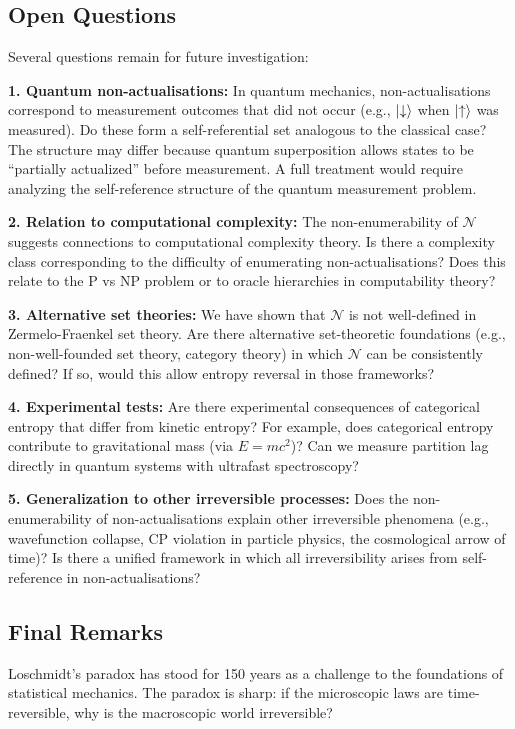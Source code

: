 \documentclass[twocolumn,10pt]{article}
\theoremstyle{definition}
\theoremstyle{remark}
\begin{document}
\subsection{Open Questions}

Several questions remain for future investigation:

\textbf{1. Quantum non-actualisations:} In quantum mechanics, non-actualisations correspond to measurement outcomes that did not occur (e.g., $\ket{\downarrow}$ when $\ket{\uparrow}$ was measured). Do these form a self-referential set analogous to the classical case? The structure may differ because quantum superposition allows states to be ``partially actualized'' before measurement. A full treatment would require analyzing the self-reference structure of the quantum measurement problem.

\textbf{2. Relation to computational complexity:} The non-enumerability of $\mathcal{N}$ suggests connections to computational complexity theory. Is there a complexity class corresponding to the difficulty of enumerating non-actualisations? Does this relate to the P vs NP problem or to oracle hierarchies in computability theory?

\textbf{3. Alternative set theories:} We have shown that $\mathcal{N}$ is not well-defined in Zermelo-Fraenkel set theory. Are there alternative set-theoretic foundations (e.g., non-well-founded set theory, category theory) in which $\mathcal{N}$ can be consistently defined? If so, would this allow entropy reversal in those frameworks?

\textbf{4. Experimental tests:} Are there experimental consequences of categorical entropy that differ from kinetic entropy? For example, does categorical entropy contribute to gravitational mass (via $E = mc^2$)? Can we measure partition lag directly in quantum systems with ultrafast spectroscopy?

\textbf{5. Generalization to other irreversible processes:} Does the non-enumerability of non-actualisations explain other irreversible phenomena (e.g., wavefunction collapse, CP violation in particle physics, the cosmological arrow of time)? Is there a unified framework in which all irreversibility arises from self-reference in non-actualisations?

\subsection{Final Remarks}

Loschmidt's paradox has stood for 150 years as a challenge to the foundations of statistical mechanics. The paradox is sharp: if the microscopic laws are time-reversible, why is the macroscopic world irreversible?
\end{document}
